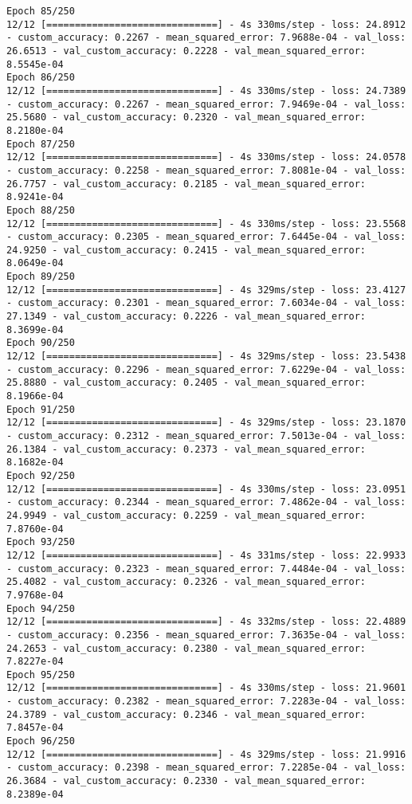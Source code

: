 \begin{lstlisting}
Epoch 85/250
12/12 [==============================] - 4s 330ms/step - loss: 24.8912 - custom_accuracy: 0.2267 - mean_squared_error: 7.9688e-04 - val_loss: 26.6513 - val_custom_accuracy: 0.2228 - val_mean_squared_error: 8.5545e-04
Epoch 86/250
12/12 [==============================] - 4s 330ms/step - loss: 24.7389 - custom_accuracy: 0.2267 - mean_squared_error: 7.9469e-04 - val_loss: 25.5680 - val_custom_accuracy: 0.2320 - val_mean_squared_error: 8.2180e-04
Epoch 87/250
12/12 [==============================] - 4s 330ms/step - loss: 24.0578 - custom_accuracy: 0.2258 - mean_squared_error: 7.8081e-04 - val_loss: 26.7757 - val_custom_accuracy: 0.2185 - val_mean_squared_error: 8.9241e-04
Epoch 88/250
12/12 [==============================] - 4s 330ms/step - loss: 23.5568 - custom_accuracy: 0.2305 - mean_squared_error: 7.6445e-04 - val_loss: 24.9250 - val_custom_accuracy: 0.2415 - val_mean_squared_error: 8.0649e-04
Epoch 89/250
12/12 [==============================] - 4s 329ms/step - loss: 23.4127 - custom_accuracy: 0.2301 - mean_squared_error: 7.6034e-04 - val_loss: 27.1349 - val_custom_accuracy: 0.2226 - val_mean_squared_error: 8.3699e-04
Epoch 90/250
12/12 [==============================] - 4s 329ms/step - loss: 23.5438 - custom_accuracy: 0.2296 - mean_squared_error: 7.6229e-04 - val_loss: 25.8880 - val_custom_accuracy: 0.2405 - val_mean_squared_error: 8.1966e-04
Epoch 91/250
12/12 [==============================] - 4s 329ms/step - loss: 23.1870 - custom_accuracy: 0.2312 - mean_squared_error: 7.5013e-04 - val_loss: 26.1384 - val_custom_accuracy: 0.2373 - val_mean_squared_error: 8.1682e-04
Epoch 92/250
12/12 [==============================] - 4s 330ms/step - loss: 23.0951 - custom_accuracy: 0.2344 - mean_squared_error: 7.4862e-04 - val_loss: 24.9949 - val_custom_accuracy: 0.2259 - val_mean_squared_error: 7.8760e-04
Epoch 93/250
12/12 [==============================] - 4s 331ms/step - loss: 22.9933 - custom_accuracy: 0.2323 - mean_squared_error: 7.4484e-04 - val_loss: 25.4082 - val_custom_accuracy: 0.2326 - val_mean_squared_error: 7.9768e-04
Epoch 94/250
12/12 [==============================] - 4s 332ms/step - loss: 22.4889 - custom_accuracy: 0.2356 - mean_squared_error: 7.3635e-04 - val_loss: 24.2653 - val_custom_accuracy: 0.2380 - val_mean_squared_error: 7.8227e-04
Epoch 95/250
12/12 [==============================] - 4s 330ms/step - loss: 21.9601 - custom_accuracy: 0.2382 - mean_squared_error: 7.2283e-04 - val_loss: 24.3789 - val_custom_accuracy: 0.2346 - val_mean_squared_error: 7.8457e-04
Epoch 96/250
12/12 [==============================] - 4s 329ms/step - loss: 21.9916 - custom_accuracy: 0.2398 - mean_squared_error: 7.2285e-04 - val_loss: 26.3684 - val_custom_accuracy: 0.2330 - val_mean_squared_error: 8.2389e-04

\end{lstlisting}
